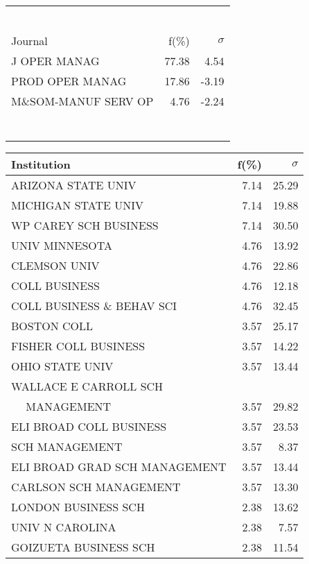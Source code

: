 \documentclass[a4paper,11pt]{report}
\begin{document}
\begin{landscape}
\begin{table}[!ht]
{\begin{tabular}{|l r  r|}
 &  & \\
 &  & \\
 &  & \\
 &  & \\
 &  & \\
 &  & \\
\hline
\hline
Journal & f(\%) & $\sigma$\\
\hline
J OPER MANAG & 77.38 & 4.54\\
PROD OPER MANAG & 17.86 & -3.19\\
M\&SOM-MANUF SERV OP & 4.76 & -2.24\\
 &  & \\
 &  & \\
 &  & \\
 &  & \\
 &  & \\
 &  & \\
 &  & \\
\hline
\end{tabular}
}
{\scriptsize\begin{tabular}{|l r r|}
\hline
Institution & f(\%) & $\sigma$\\
\hline
ARIZONA STATE UNIV & 7.14 & 25.29\\
MICHIGAN STATE UNIV & 7.14 & 19.88\\
WP CAREY SCH BUSINESS & 7.14 & 30.50\\
UNIV MINNESOTA & 4.76 & 13.92\\
CLEMSON UNIV & 4.76 & 22.86\\
COLL BUSINESS & 4.76 & 12.18\\
COLL BUSINESS \& BEHAV SCI & 4.76 & 32.45\\
BOSTON COLL & 3.57 & 25.17\\
FISHER COLL BUSINESS & 3.57 & 14.22\\
OHIO STATE UNIV & 3.57 & 13.44\\
WALLACE E CARROLL SCH &  & \\
$\quad$ MANAGEMENT & 3.57 & 29.82\\
ELI BROAD COLL BUSINESS & 3.57 & 23.53\\
SCH MANAGEMENT & 3.57 & 8.37\\
ELI BROAD GRAD SCH MANAGEMENT & 3.57 & 13.44\\
CARLSON SCH MANAGEMENT & 3.57 & 13.30\\
LONDON BUSINESS SCH & 2.38 & 13.62\\
UNIV N CAROLINA & 2.38 & 7.57\\
GOIZUETA BUSINESS SCH & 2.38 & 11.54\\

\end{tabular}}
\end{table}
\end{landscape}
\end{document}
